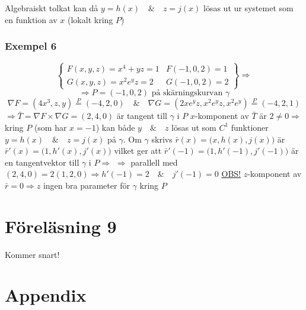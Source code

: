 \documentclass{article}
\begin{document}
Algebraiskt tolkat kan då \(y = h(x) \quad\&\quad z = j(x)\) lösas ut ur systemet som en funktion av \(x\) (lokalt kring \(P\))

\subsubsection{Exempel 6} 
\begin{equation}\label{eq:8.8}
	\begin{Bmatrix}
		F(x,y,z) = x^4 + yz = 1 & F(-1,0,2) = 1 \\
		G(x,y,z) = x^2e^yz = 2 & G(-1,0,2) = 2
	\end{Bmatrix} \Rightarrow
\end{equation}
\[\Rightarrow P = (-1,0,2) \text{ på skärningskurvan } \gamma\]
\[\nabla F = (4x^3,z,y) \overset{P}{=} (-4,2,0) \quad\&\quad \nabla G = (2xe^yz,x^2e^yz,x^2e^y) \overset{P}{=} (-4,2,1)\]
\(\Rightarrow \bar{T} = \nabla F \times \nabla G = (2,4,0)\) är tangent till \(\gamma\) i \(P\) \newline
\(x\)-komponent av \(\bar{T}\) är \(2 \neq 0 \Rightarrow\) kring \(P\) (som har \(x = -1\)) kan både \(y \quad\&\quad z\) lösas ut som \(C^1\) funktioner \(y = h(x) \quad\&\quad z = j(x)\) på \(\gamma\). \newline
Om \(\gamma\) skrivs \(\bar{r}(x) = \Big(x,h(x),j(x)\Big)\) är \(\bar{r}'(x) = \Big(1,h'(x),j'(x)\Big)\) vilket ger att \(\bar{r}'(-1) = \Big(1,h'(-1),j'(-1)\Big)\) är en tangentvektor till \(\gamma\) i \(P \Rightarrow\) \newline
\(\Rightarrow\) parallell med \((2,4,0) = 2(1,2,0) \Rightarrow h'(-1) = 2 \quad\&\quad j'(-1) = 0\) \newline
\underline{OBS!} \(z\)-komponent av \(\bar{r} = 0 \Rightarrow z\) ingen bra parameter för \(\gamma\) kring \(P\)






\section{Föreläsning 9}

Kommer snart!

\newpage
\fancyhf{}
\section{Appendix}
\begin{appendix}
	\listoffigures
	\listoftables
\end{appendix}
\end{document}
